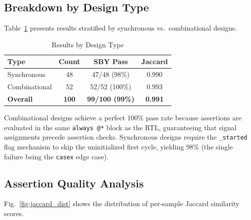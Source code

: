 \documentclass[conference]{IEEEtran}
\begin{document}
\subsection{Breakdown by Design Type}

Table~\ref{tab:breakdown} presents results stratified by synchronous vs.\ combinational designs.

\begin{table}[t]
\centering
\caption{Results by Design Type}
\label{tab:breakdown}
\begin{tabular}{@{}lccc@{}}
\toprule
\textbf{Type} & \textbf{Count} & \textbf{SBY Pass} & \textbf{Jaccard} \\
\midrule
Synchronous & 48 & 47/48 (98\%) & 0.990 \\
Combinational & 52 & 52/52 (100\%) & 0.993 \\
\midrule
\textbf{Overall} & \textbf{100} & \textbf{99/100 (99\%)} & \textbf{0.991} \\
\bottomrule
\end{tabular}
\end{table}

Combinational designs achieve a perfect 100\% pass rate because assertions are evaluated in the same \texttt{always @*} block as the RTL, guaranteeing that signal assignments precede assertion checks. Synchronous designs require the \texttt{\_started} flag mechanism to skip the uninitialized first cycle, yielding 98\% (the single failure being the \texttt{casex} edge case).

\subsection{Assertion Quality Analysis}

Fig.~\ref{fig:jaccard_dist} shows the distribution of per-sample Jaccard similarity scores.
\end{document}
